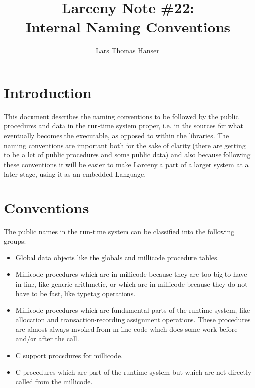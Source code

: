 
\title{Larceny Note \#22: \\
       Internal Naming Conventions}
\author{Lars Thomas Hansen}


\maketitle

\section{Introduction}

This document describes the naming conventions to be followed by the public
procedures and data in the run-time system proper, i.e. in the sources for
what eventually becomes the executable, as opposed to within the libraries.
The naming conventions are important both for the sake of clarity (there are
getting to be a lot of public procedures and some public data) and also
because following these conventions it will be easier to make Larceny a part
of a larger system at a later stage, using it as an embedded Language.

\section{Conventions}

The public names in the run-time system can be classified into the following
groups:

\begin{itemize}
\item
Global data objects like the globals and millicode procedure tables.

\item 
Millicode procedures which are in millicode because they are too big to
have in-line, like generic arithmetic, or which are in millicode because
they do not have to be fast, like typetag operations.

\item
Millicode procedures which are fundamental parts of the runtime system,
like allocation and transaction-recording assignment operations. These
procedures are almost always invoked from in-line code which does some
work before and/or after the call.

\item
C support procedures for millicode.

\item
C procedures which are part of the runtime system but which are not
directly called from the millicode.

\end{itemize}

